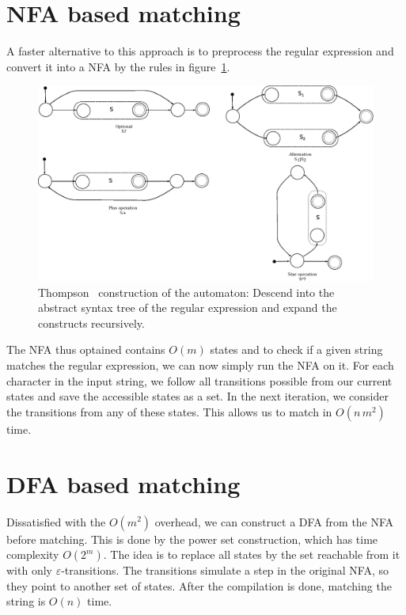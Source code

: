 \documentclass[11pt]{Thesis}
\theoremstyle{definition}
\newcommand{\Figref}[1]{figure~\ref{fig:#1}}
\begin{document}
\section{NFA based matching}
A faster alternative to this approach is to preprocess the regular expression 
and convert it into a NFA by the rules in \Figref{thompson-construction-simple}.

\begin{figure}[htb] \includegraphics[width=\linewidth]{graphs/thompson-simple}
  \caption[Thompson construction]{Thompson~\cite{Thom68a} construction of the
automaton: Descend into the abstract syntax tree of the regular
expression and expand the constructs recursively.}
\label{fig:thompson-construction-simple} 
\end{figure}

The NFA thus optained contains $O(m)$ states and to check if a given string 
matches the regular expression, we can now simply run the NFA on it. For each 
character in the input string, we follow all transitions possible from our 
current states and save the accessible states as a set. In the next 
iteration, we consider the transitions from any of these states. This allows 
us to match in $O(n\, m^2)$ time.

\section{DFA based matching}
Dissatisfied with the $O(m^2)$ overhead, we can construct a DFA from the NFA 
before matching. This is done by the power set construction\cite{Sips05a}, 
which has time complexity $O(2^m)$. The idea is to replace all states by the 
set reachable from it with only $\varepsilon$-transitions. The transitions 
simulate a step in the original NFA, so they point to another set of states.
After the compilation is done, matching the string is $O(n)$ time.
\end{document}
